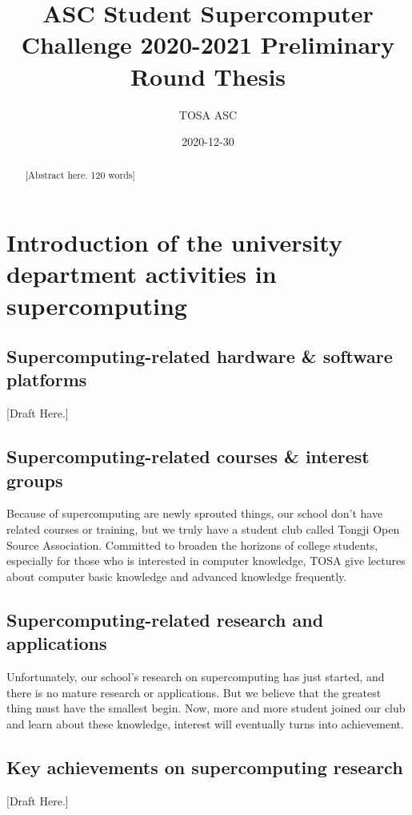 \documentclass[a4paper, 11pt]{article}
\title{ASC Student Supercomputer Challenge 2020-2021 Preliminary Round Thesis}
\author{TOSA ASC}
\date{2020-12-30}
\begin{document}
	\maketitle
	
	\begin{abstract}
		[Abstract here. 120 words]
	\end{abstract}
	
	\tableofcontents
	\newpage
	
	

	\section{Introduction of the university department activities in supercomputing}
		\subsection{Supercomputing-related hardware \& software platforms} [Draft Here.]
		\subsection{Supercomputing-related courses \& interest groups} 
		
			Because of supercomputing are newly sprouted things, our school don’t have related courses or training, but we truly have a student club called Tongji Open Source Association. Committed to broaden the horizons of college students, especially for those who is interested in computer knowledge, TOSA give lectures about computer basic knowledge and advanced knowledge frequently.
			
		\subsection{Supercomputing-related research and applications}
		
			Unfortunately, our school's research on supercomputing has just started, and there is no mature research or applications. But we believe that the greatest thing must have the smallest begin. Now, more and more student joined our club and learn about these knowledge, interest will eventually turns into achievement.
			
		\subsection{Key achievements on supercomputing research} [Draft Here.]
\end{document}
